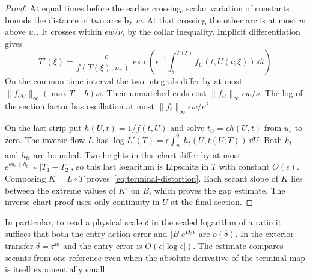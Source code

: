 \begin{proof}
At equal times before the earlier crossing, scalar variation of constants
bounds the distance of two arcs by $w$. At that crossing the other arc
is at most $w$ above $u_c$. It crosses within $\epsilon w/\nu$, by
the collar inequality. Implicit differentiation gives
\[
 T'(\xi)=\frac{-\epsilon}{f(T(\xi),u_c)}
 \exp\!\left(\epsilon^{-1}\int_b^{T(\xi)}f_U(t,U(t;\xi))\,\dd t\right).
\]
On the common time interval the two integrals differ by at most
$\|f_{UU}\|_\infty (\max T-b)w$. Their unmatched ends cost
$\|f_U\|_\infty\epsilon w/\nu$. The log of the section factor has
oscillation at most $\|f_t\|_\infty\epsilon w/\nu^2$.

On the last strip put $h(U,t)=1/f(t,U)$ and solve
$t_U=\epsilon h(U,t)$ from $u_c$ to zero. The inverse flow $L$ has
$\log L'(T)=\epsilon\int_{u_c}^0 h_t(U,t(U;T))\,\dd U$.
Both $h_t$ and $h_{tt}$ are bounded. Two heights in this chart differ
by at most $e^{\epsilon u_c\|h_t\|_\infty}|T_1-T_2|$, so this last
logarithm is Lipschitz in $T$ with constant $O(\epsilon)$.
Composing $K=L\circ T$ proves~\eqref{eq:terminal-distortion}.
Each secant slope of $K$ lies between the extreme values of $K'$ on $B$,
which proves the gap estimate. The inverse-chart proof uses only
continuity in $U$ at the final section.
\end{proof}

In particular, to read a physical scale $\delta$ in the scaled
logarithm of a ratio it suffices that both the entry-action error
and $|B|e^{D/\epsilon}$ are $o(\delta)$. In the exterior transfer
$\delta=\tau^m$ and the entry error is $O(\epsilon|\log\epsilon|)$.
The estimate compares secants from one reference even when the absolute
derivative of the terminal map is itself exponentially small.
